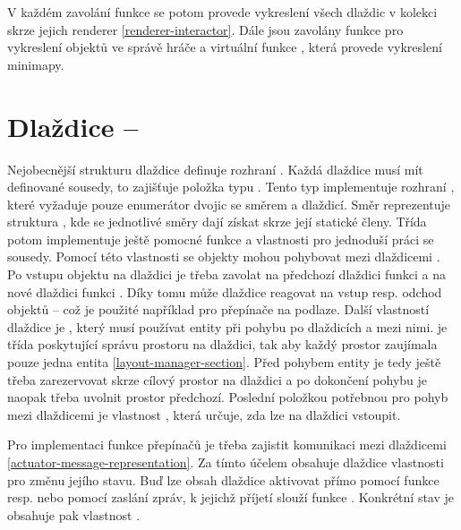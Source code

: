 V každém zavolání funkce  se potom provede vykreslení všech dlaždic v kolekci 
skrze jejich renderer \vref{renderer-interactor}. Dále jsou zavolány funkce  pro vykreslení objektů
ve správě hráče a virtuální funkce , která provede vykreslení minimapy.


\section{Dlaždice -- }
Nejobecnější strukturu dlaždice definuje rozhraní . Každá dlaždice musí mít definované sousedy,
to zajišťuje položka  typu . Tento typ implementuje rozhraní ,
které vyžaduje pouze enumerátor dvojic se směrem a dlaždicí. Směr reprezentuje struktura , kde
se jednotlivé směry dají získat skrze její statické členy. Třída  potom implementuje ještě
pomocné funkce a vlastnosti pro jednoduší práci se sousedy. Pomocí této vlastnosti se objekty mohou pohybovat
mezi dlaždicemi . Po vstupu objektu na dlaždici je třeba zavolat na předchozí dlaždici funkci  a
na nové dlaždici funkci . Díky tomu může dlaždice reagovat na vstup resp. odchod objektů --
což je použité například pro přepínače na podlaze. Další vlastností dlaždice je , který 
musí používat entity při pohybu po dlaždicích a mezi nimi.  je třída poskytující správu prostoru
na dlaždici, tak aby každý prostor zaujímala pouze jedna entita \vref{layout-manager-section}. Před pohybem entity je
tedy ještě třeba zarezervovat skrze  cílový prostor na dlaždici a po dokončení pohybu
je naopak třeba uvolnit prostor předchozí. Poslední položkou potřebnou pro pohyb mezi dlaždicemi je vlastnost
, která určuje, zda lze na dlaždici vstoupit.


Pro implementaci funkce přepínačů je třeba zajistit komunikaci mezi dlaždicemi \vref{actuator-message-representation}.
Za tímto účelem obsahuje dlaždice vlastnosti pro změnu jejího stavu. Buď lze obsah dlaždice aktivovat přímo
pomocí funkce  resp.  nebo pomocí zaslání zpráv, k jejichž
příjetí slouží funkce . Konkrétní stav je obsahuje pak vlastnost .


